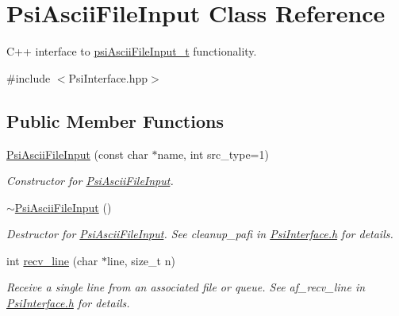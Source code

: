 \hypertarget{classPsiAsciiFileInput}{}\section{Psi\+Ascii\+File\+Input Class Reference}
\label{classPsiAsciiFileInput}


C++ interface to \hyperlink{structpsiAsciiFileInput__t}{psi\+Ascii\+File\+Input\+\_\+t} functionality.  




{\ttfamily \#include $<$Psi\+Interface.\+hpp$>$}

\subsection*{Public Member Functions}
\begin{DoxyCompactItemize}
\item 
\hyperlink{classPsiAsciiFileInput_aaf0db20856965c11699fc8d3f22562bc}{Psi\+Ascii\+File\+Input} (const char $\ast$name, int src\+\_\+type=1)
\begin{DoxyCompactList}\small\item\em Constructor for \hyperlink{classPsiAsciiFileInput}{Psi\+Ascii\+File\+Input}. \end{DoxyCompactList}\item 
\mbox{\label{classPsiAsciiFileInput_a9e4b866a3986c47ca87309380f8c9c9c}} 
\hyperlink{classPsiAsciiFileInput_a9e4b866a3986c47ca87309380f8c9c9c}{$\sim$\+Psi\+Ascii\+File\+Input} ()
\begin{DoxyCompactList}\small\item\em Destructor for \hyperlink{classPsiAsciiFileInput}{Psi\+Ascii\+File\+Input}. See cleanup\+\_\+pafi in \hyperlink{PsiInterface_8h_source}{Psi\+Interface.\+h} for details. \end{DoxyCompactList}\item 
int \hyperlink{classPsiAsciiFileInput_a75d19d237c5166654bea8360ac4a4056}{recv\+\_\+line} (char $\ast$line, size\+\_\+t n)
\begin{DoxyCompactList}\small\item\em Receive a single line from an associated file or queue. See af\+\_\+recv\+\_\+line in \hyperlink{PsiInterface_8h_source}{Psi\+Interface.\+h} for details. \end{DoxyCompactList}\end{DoxyCompactItemize}


